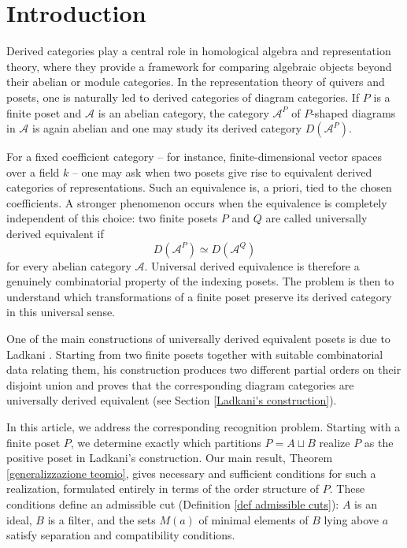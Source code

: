 \section{Introduction}
Derived categories play a central role in homological algebra and representation theory, where they provide a framework for comparing algebraic objects beyond their abelian or module categories. In the representation theory of quivers and posets, one is naturally led to derived categories of diagram categories. If $P$ is a finite poset and $\mathcal{A}$ is an abelian category, the category $\mathcal{A}^P$ of $P$-shaped diagrams in $\mathcal{A}$ is again abelian and one may study its derived category $D(\mathcal{A}^P)$. 

For a fixed coefficient category -- for instance, finite-dimensional vector spaces over a field $k$ -- one may ask when two posets give rise to equivalent derived categories of representations. Such an equivalence is, a priori, tied to the chosen coefficients. A stronger phenomenon occurs when the equivalence is completely independent of this choice: two finite posets $P$ and $Q$ are called universally derived equivalent if
\[D(\mathcal{A}^P) \simeq D(\mathcal{A}^Q)\] for every abelian category $\mathcal{A}$. 
Universal derived equivalence is therefore a genuinely combinatorial property of the indexing posets. The problem is then to understand which transformations of a finite poset preserve its derived category in this universal sense. 

One of the main constructions of universally derived equivalent posets is due to Ladkani \cite{ladkani}. Starting from two finite posets together with suitable combinatorial data relating them, his construction produces two different partial orders on their disjoint union and proves that the corresponding diagram categories are universally derived equivalent (see Section \ref{Ladkani's construction}).

In this article, we address the corresponding recognition problem. Starting with a finite poset $P$, we determine exactly which partitions $P=A \sqcup B$ realize $P$ as the positive poset in Ladkani's construction. Our main result, Theorem \ref{generalizzazione teomio}, gives necessary and sufficient conditions for such a realization, formulated entirely in terms of the order structure of $P$. These conditions define an admissible cut (Definition \ref{def admissible cuts}): $A$ is an ideal, $B$ is a filter, and the sets $M(a)$ of minimal elements of $B$ lying above $a$ satisfy separation and compatibility conditions.

